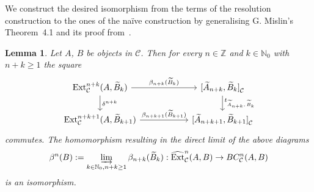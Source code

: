 \documentclass[12pt,a4paper]{article}
\numberwithin{equation}{section}
\newtheorem{lem}[thm]{Lemma}
\theoremstyle{nonumberplain}
\begin{document}
We construct the desired isomorphism from the terms of the resolution construction to the ones of the naïve construction by generalising G.\! Mislin's Theorem~4.1 and its proof from~\cite{mis94}.

\begin{lem}\label{lem:betisomorphism}
Let $A$, $B$ be objects in $\mathcal{C}$. Then for every $n \in \mathbb{Z}$ and $k \in \mathbb{N}_0$ with $n+k \geq 1$ the square
\begin{equation}\label{diag:inducedbeta}
\begin{tikzcd}
  \mathrm{Ext}_{\mathcal{C}}^{n+k}(A, \widetilde{B}_k) \arrow[rr, "\beta_{n+k}(\widetilde{B}_k)"] \arrow[d, "\delta^{n+k}"]
    &{}
    &{[}\widetilde{A}_{n+k}{,} \, \widetilde{B}_k{]}_{\mathcal{C}} \arrow[d, "t_{\widetilde{A}_{n+k}{,} \, \widetilde{B}_k}"] \\
  \mathrm{Ext}_{\mathcal{C}}^{n+k+1}(A, \widetilde{B}_{k+1}) \arrow[rr, "\beta_{n+k+1}(\widetilde{B}_{k+1})"]
    &{}
    &{[}\widetilde{A}_{n+k+1}{,} \, \widetilde{B}_{k+1}{]}_{\mathcal{C}}
\end{tikzcd}
\end{equation}
commutes. The homomorphism resulting in the direct limit of the above diagrams
\[ \beta^n(B) := \varinjlim_{k \in \mathbb{N}_0, n+k \geq 1} \beta_{n+k}(\widetilde{B}_k): \widehat{\mathrm{Ext}}_{\mathcal{C}}^n(A, B) \rightarrow BC_{\mathcal{C}}^n(A, B) \]
is an isomorphism.
\end{lem}
\end{document}
